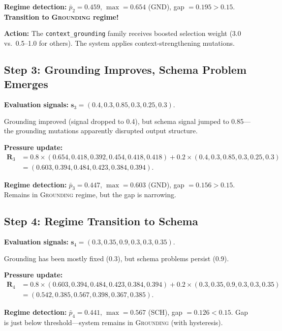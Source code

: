 \textbf{Regime detection:} $\bar{p}_2 = 0.459$, $\max = 0.654$ (GND), gap $= 0.195 > 0.15$. \textbf{Transition to \textsc{Grounding} regime!}

\textbf{Action:} The \texttt{context\_grounding} family receives boosted selection weight (3.0 vs.\ 0.5--1.0 for others). The system applies context-strengthening mutations.

\subsection{Step 3: Grounding Improves, Schema Problem Emerges}

\textbf{Evaluation signals:} $\mathbf{s}_3 = (0.4, 0.3, 0.85, 0.3, 0.25, 0.3)$.

Grounding improved (signal dropped to 0.4), but schema signal jumped to 0.85---the grounding mutations apparently disrupted output structure.

\textbf{Pressure update:}
\[
\begin{aligned}
\mathbf{R}_3
&= 0.8 \times (0.654, 0.418, 0.392, 0.454, 0.418, 0.418) + 0.2 \times (0.4, 0.3, 0.85, 0.3, 0.25, 0.3)  \\
&= (0.603, 0.394, 0.484, 0.423, 0.384, 0.394).
\end{aligned}
\]

\textbf{Regime detection:} $\bar{p}_3 = 0.447$, $\max = 0.603$ (GND), gap $= 0.156 > 0.15$. Remains in \textsc{Grounding} regime, but the gap is narrowing.

\subsection{Step 4: Regime Transition to Schema}

\textbf{Evaluation signals:} $\mathbf{s}_4 = (0.3, 0.35, 0.9, 0.3, 0.3, 0.35)$.

Grounding has been mostly fixed (0.3), but schema problems persist (0.9).

\textbf{Pressure update:}
\[
\begin{aligned}
\mathbf{R}_4
&= 0.8 \times (0.603, 0.394, 0.484, 0.423, 0.384, 0.394) + 0.2 \times (0.3, 0.35, 0.9, 0.3, 0.3, 0.35)  \\
&= (0.542, 0.385, 0.567, 0.398, 0.367, 0.385).
\end{aligned}
\]

\textbf{Regime detection:} $\bar{p}_4 = 0.441$, $\max = 0.567$ (SCH), gap $= 0.126 < 0.15$. Gap is just below threshold---system remains in \textsc{Grounding} (with hysteresis).


